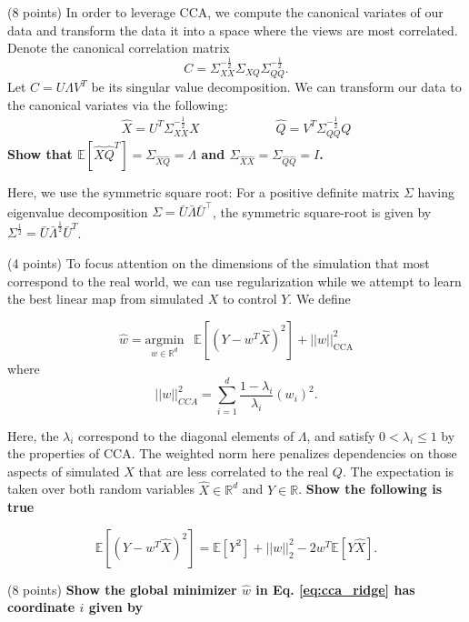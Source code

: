 \begin{Parts}

\Part (8 points) In order to leverage CCA, we compute the canonical variates of
our data and transform the data it into a space where the views are most
correlated. Denote the canonical correlation matrix 
$$C= \Sigma_{XX}^{-\frac{1}{2}}\Sigma_{XQ}\Sigma_{QQ}^{-\frac{1}{2}}.$$ 
Let $C = U \Lambda V^T$ be its singular value decomposition.
We can transform our data to the canonical variates via the following: 
	\begin{align*}
	\hat{X} = U^T\Sigma_{XX}^{-\frac{1}{2}} X \qquad \qquad \qquad
	\hat{Q} = V^T\Sigma_{QQ}^{-\frac{1}{2}} Q
	\end{align*}
 {\bf Show that $\mathbb{E}[\hat{X} \hat{Q}^T] = \Sigma_{\hat{X}\hat{Q}} =
   \Lambda$ and  $\Sigma_{\hat{X}\hat{X}} =  \Sigma_{\hat{Q}\hat{Q}} =
   I$.} 

Here, we use the symmetric square root: For a positive definite matrix $\Sigma$ having eigenvalue decomposition $\Sigma = \bar{U} \bar{\Lambda} \bar{U}^\top$, the symmetric square-root is given by $\Sigma^{\frac{1}{2}} = \bar{U}
 \bar{\Lambda}^{\frac{1}{2}} \bar{U}^T$. 




\ifexamnosol
\newpage
\fi
\Part (4 points) To focus attention on the dimensions of the simulation that
most correspond to the real world, we can use regularization while we
attempt to learn the best linear map from simulated $X$ to control $Y$. 
We define

\begin{equation}\label{eq:cca_ridge}
 \hat{w} = \underset{w\in \mathbb{R}^d}{\mbox{argmin}} \:\;\; \mathbb{E} [(Y - w^T\hat{X})^2] + ||w||^2_{\mbox{CCA}}
\end{equation}
where
 $$||w||^2_{CCA} = \sum^{d}_{i=1}\frac{1-\lambda_i}{\lambda_i} (w_i)^2.$$

Here, the $\lambda_i$ correspond to the diagonal elements of $\Lambda$,
and satisfy $0 < \lambda_i \leq 1$ by the properties of CCA. The
weighted norm here penalizes dependencies on those aspects of
simulated $X$ that are less correlated to the real $Q$. The
expectation is taken over both random variables $\hat{X} \in 
\mathbb{R}^d$ and $Y\in \mathbb{R}$. 
{\bf Show the following is true}


$$\mathbb{E}[ (Y - w^T\hat{X})^2]  = \mathbb{E}[Y^2] + ||w||^2_2 - 2w^T\mathbb{E}[Y\hat{X}].$$




\ifexamnosol
\newpage
\fi
\Part (8 points) {\bf Show the global minimizer $\hat{w}$ in Eq. \eqref{eq:cca_ridge} has coordinate $i$ given by}


\end{Parts}
